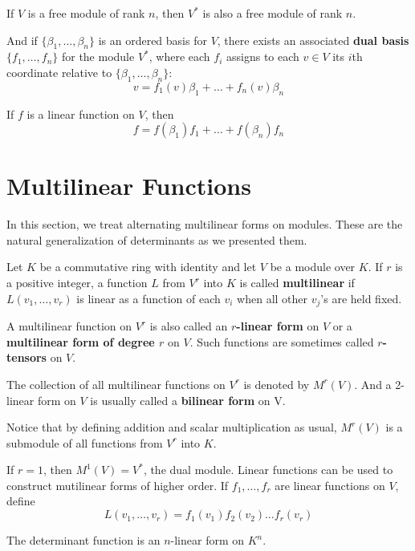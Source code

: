 If $V$ is a free module of rank $n$, then $V^\ast$ is also a free module of rank $n$.

And if $\{ \beta_1, \ldots, \beta_n \}$ is an ordered basis for $V$, there exists an associated \textbf{dual basis} $\{ f_1, \ldots, f_n \}$ for the module $V^\ast$, where each $f_i$ assigns to each $v \in V$ its $i$th coordinate relative to $\{ \beta_1, \ldots, \beta_n \}$:
\[
	v = f_1(v) \beta_1 + \ldots + f_n(v) \beta_n
\]

If $f$ is a linear function on $V$, then
\[
	f = f(\beta_1)f_1 + \ldots + f(\beta_n)f_n
\]

\section{Multilinear Functions}

In this section, we treat alternating multilinear forms on modules. These are the natural generalization of determinants as we presented them. 

\begin{definition}
	Let $K$ be a commutative ring with identity and let $V$ be a module over $K$. If $r$ is a positive integer, a function $L$ from $V^r$ into $K$ is called \textbf{multilinear} if $L(v_1, \ldots, v_r)$ is linear as a function of each $v_i$ when all other $v_j$'s are held fixed.
	
	A multilinear function on $V^r$ is also called an \textbf{$r$-linear form} on $V$ or a \textbf{multilinear form of degree $r$} on $V$. Such functions are sometimes called \textbf{$r$-tensors} on $V$.
	
	The collection of all multilinear functions on $V^r$ is denoted by $M^r(V)$. And a 2-linear form on $V$ is usually called a \textbf{bilinear form} on V.
\end{definition}

Notice that by defining addition and scalar multiplication as usual, $M^r(V)$ is a submodule of all functions from $V^r$ into $K$.

If $r = 1$, then $M^1(V) = V^\ast$, the dual module. Linear functions can be used to construct mutilinear forms of higher order. If $f_1, \ldots, f_r$ are linear functions on $V$, define
\[
	L(v_1, \ldots, v_r) = f_1(v_1) f_2(v_2) \ldots f_r(v_r)
\]

\begin{example}
	The determinant function is an $n$-linear form on $K^n$.
\end{example}

